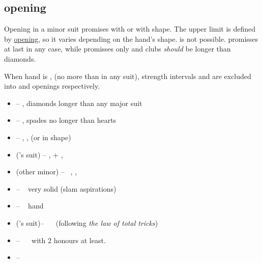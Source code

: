 \subsection{\ctr{1\protect\minor} opening}
\label{subsec:1min-op}

Opening in a minor suit promises  with  or  with \bal\/ shape. The upper limit
is defined by \hyperref[subsec:2c-op]{\ctr{2\c} opening}, so it varies depending on the hand's shape. 
is not possible. \ctr{1\d} promisses at last  in any case, while \ctr{1\c} promisses only 
and clubs \emph{should} be longer than diamonds.

When hand is \bal, (no more than  in any suit), strength intervals  and  are
excluded into \ctr{1\nt} and \ctr{2\nt} openings respectively.

\begin{itemize}
  \newcommand{\nomajor}[1]{\no\ \suit{#1+}{\major}}
  \newcommand{\strongws}{\hcp{16}{} if \ws{}}

  \item \ctr{1\d} --  , diamonds longer than any major suit
  \item \ctr{1\major} --  , spades no longer than hearts
  \item \ctr{1\nt} -- \nat, ,  (or  in \bal\/ shape)
  \item \ctr{2\minor} (\opn's suit) -- \semi\nat, \inv+ , \nomajor{4}
  \item \ctr{2\minor} (other minor) -- \nat\ \gf, , \nomajor{5}
  \item \ctr{2\major} -- \nat\ \gf\/ very solid  (slam aspirations)
  \item \ctr{2\nt} -- \nat\ \inv \bal\/ hand
  \item \ctr{3\minor} (\opn's suit)-- \nat\ \preempt\  (following \emph{the law of total tricks})
  \item {} -- \nat\ \inv\  with 2 honours at least.
  \item \ctr{3\nt} -- \so
\end{itemize}
